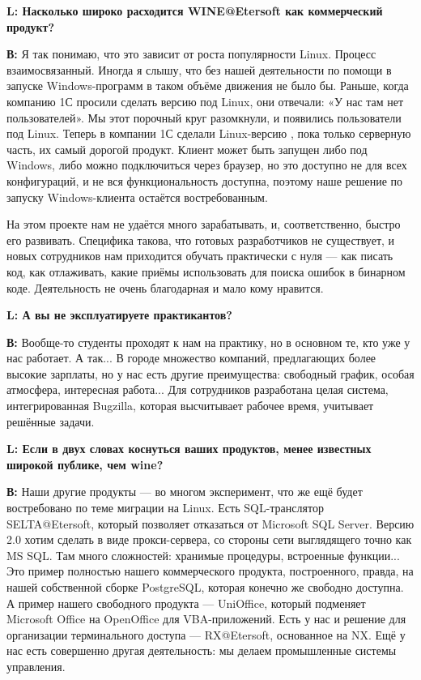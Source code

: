 \documentclass[10pt, a5paper]{article}
\begin{document}
{\noindent \bf L: Насколько широко расходится  WINE@Etersoft как коммерческий продукт?}

{\noindent \bf В:} Я так понимаю, что это зависит от роста популярности Linux. Процесс взаимосвязанный. Иногда я слышу, что без нашей деятельности по помощи в запуске Windows-программ в таком объёме движения не было бы. Раньше, когда компанию 1С просили сделать версию под Linux, они отвечали: «У нас там нет пользователей». Мы этот порочный круг разомкнули, и появились пользователи под Linux. Теперь в компании 1С сделали Linux-версию , пока только серверную часть, их самый дорогой продукт. Клиент может быть запущен либо под Windows, либо можно подключиться через браузер, но это доступно не для всех конфигураций, и не вся функциональность доступна, поэтому наше решение по запуску Windows-клиента остаётся востребованным.

На этом проекте нам не удаётся много зарабатывать, и, соответственно, быстро его развивать. Специфика такова, что готовых разработчиков не существует, и новых сотрудников нам приходится обучать практически с нуля — как писать код, как отлаживать, какие приёмы использовать для поиска ошибок в бинарном коде. Деятельность не очень благодарная и мало кому нравится.

{\noindent \bf L: А вы не эксплуатируете практикантов?}

{\noindent \bf В:} Вообще-то студенты проходят к нам на практику, но в основном те, кто уже у нас работает. А так... В городе множество компаний, предлагающих более высокие зарплаты, но у нас есть другие преимущества:  свободный график, особая атмосфера, интересная работа... Для сотрудников разработана целая система,  интегрированная  Bugzilla, которая высчитывает рабочее время, учитывает решённые задачи.

{\noindent \bf L: Если в двух словах коснуться ваших продуктов, менее известных широкой публике, чем wine?}

{\noindent \bf В:} Наши другие продукты --- во многом эксперимент, что же ещё будет востребовано по теме миграции на Linux. Есть SQL-транслятор SELTA@Etersoft, который позволяет отказаться от Microsoft SQL Server. Версию 2.0 хотим сделать в виде прокси-сервера, со стороны сети выглядящего точно как MS SQL. Там много сложностей: хранимые процедуры, встроенные функции... Это пример полностью нашего коммерческого продукта, построенного, правда, на нашей собственной сборке PostgreSQL, которая конечно же свободно доступна. А пример нашего свободного продукта --- UniOffice, который  подменяет Microsoft Office на OpenOffice для VBA-приложений. Есть у нас и решение для организации терминального доступа --- RX@Etersoft, основанное на NX. Ещё у нас есть совершенно другая деятельность: мы делаем промышленные системы управления. 
\end{document}
